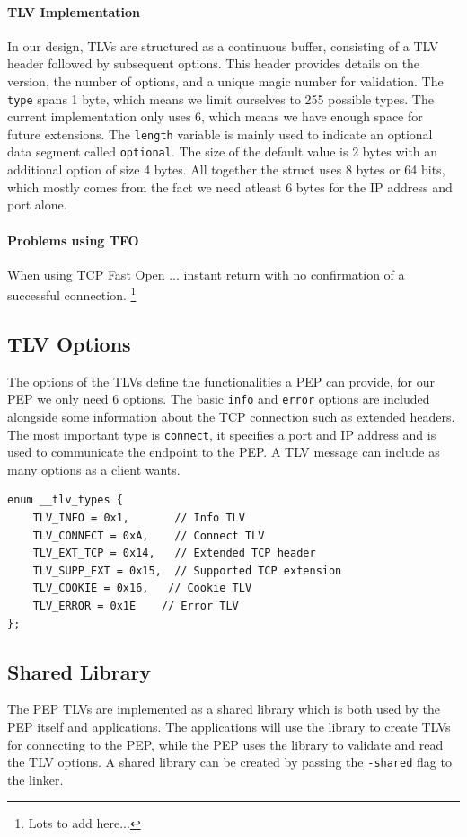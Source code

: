 \documentclass[a4paper,english, 11pt]{report}
\begin{document}
\paragraph{TLV Implementation}
In our design, TLVs are structured as a continuous buffer, consisting of a TLV header followed by subsequent options.  This header provides details on the version, the number of options, and a unique magic number for validation. The \verb|type| spans 1 byte, which means we limit ourselves to 255 possible types. The current implementation only uses 6, which means we have enough space for future extensions. The \verb|length| variable is mainly used to indicate an optional data segment called \verb|optional|. The size of the default value is 2 bytes with an additional option of size 4 bytes. All together the struct uses 8 bytes or 64 bits, which mostly comes from the fact we need atleast 6 bytes for the IP address and port alone. 

\paragraph{Problems using TFO}
When using TCP Fast Open ... instant return with no confirmation of a successful connection. \footnote{Lots to add here...}

\subsection{TLV Options}
The options of the TLVs define the functionalities a PEP can provide, for our PEP we only need 6 options. The basic \verb|info| and \verb|error| options are included alongside some information about the TCP connection such as extended headers. The most important type is \verb|connect|, it specifies a port and IP address and is used to communicate the endpoint to the PEP. A TLV message can include as many options as a client wants.

\begin{verbatim}
enum __tlv_types {
    TLV_INFO = 0x1,    	  // Info TLV
    TLV_CONNECT = 0xA,    // Connect TLV          
    TLV_EXT_TCP = 0x14,   // Extended TCP header
    TLV_SUPP_EXT = 0x15,  // Supported TCP extension
    TLV_COOKIE = 0x16,   // Cookie TLV
    TLV_ERROR = 0x1E    // Error TLV
};
\end{verbatim}

\subsection{Shared Library}
The PEP TLVs are implemented as a shared library which is both used by the PEP itself and applications. The applications will use the library to create TLVs for connecting to the PEP, while the PEP uses the library to validate and read the TLV options. 
A shared library can be created by passing the \verb|-shared| flag to the linker.
\end{document}
